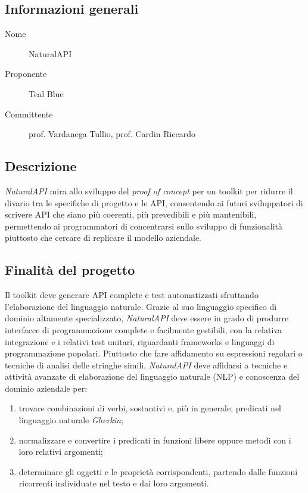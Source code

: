 \documentclass[../studio-di-fattibilita.tex]{subfiles}
\begin{document}
  \subsection{Informazioni generali}%
  \label{subsec:informazioni_generali}
  \begin{description}
    \item[Nome] NaturalAPI
    \item[Proponente] Teal Blue
    \item[Committente] prof. Vardanega Tullio, prof. Cardin Riccardo
  \end{description}


  \subsection{Descrizione}%
  \label{subsec:descrizione}
  \textit{NaturalAPI} mira allo sviluppo del \textit{proof of concept} per un toolkit per ridurre il divario tra le specifiche di progetto e le API, consentendo ai futuri sviluppatori di scrivere API che siano più coerenti, più prevedibili e più mantenibili, permettendo ai programmatori di concentrarsi sullo sviluppo di funzionalità piuttosto che cercare di replicare il modello aziendale.


  \subsection{Finalità del progetto}%
  \label{subsec:finalita_del_progetto}
  Il toolkit deve generare API complete e test automatizzati sfruttando l'elaborazione del linguaggio naturale.
  Grazie al suo linguaggio specifico di dominio altamente specializzato, \textit{NaturalAPI} deve essere in grado di produrre interfacce di programmazione complete e facilmente gestibili, con la relativa integrazione e i relativi test unitari, riguardanti frameworks e linguaggi di programmazione popolari.
  Piuttosto che fare affidamento su espressioni regolari o tecniche di analisi delle stringhe simili, \textit{NaturalAPI} deve affidarsi a tecniche e attività avanzate di elaborazione del linguaggio naturale (NLP) e conoscenza del dominio aziendale per:
    \begin{enumerate}
      \item trovare combinazioni di verbi, sostantivi e, più in generale, predicati nel linguaggio naturale \textit{Gherkin};
      \item normalizzare e convertire i predicati in funzioni libere oppure metodi con i loro relativi argomenti;
      \item determinare gli oggetti e le proprietà corrispondenti, partendo dalle funzioni ricorrenti individuate nel testo e dai loro argomenti.
    \end{enumerate}
\end{document}

